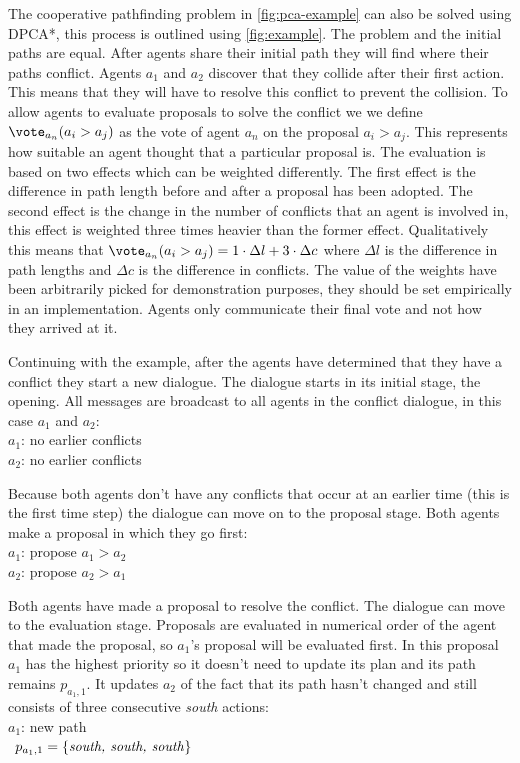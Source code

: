 The cooperative pathfinding problem in \autoref{fig:pca-example} can also be 
solved using DPCA*, this process is outlined using \autoref{fig:example}. The 
problem and the initial paths are equal. After agents share their initial path 
they will find where their paths conflict. Agents $a_1$ and $a_2$ discover that 
they collide after their first action. This means that they will have to 
resolve this conflict to prevent the collision. To allow agents to evaluate 
proposals to solve the conflict we we define $\vote_{a_n}(a_i > a_j)$ as 
the vote of agent $a_n$ on the proposal $a_i > a_j$. This represents how 
suitable an agent thought that a particular proposal is. The evaluation  is 
based on two effects which can be weighted
differently. The first effect is the difference in path length before and after
a proposal has been adopted. The second effect is the change in the number of
conflicts that an agent is involved in, this effect is weighted three times
heavier than the former effect. Qualitatively this means that $\vote_{a_n}(a_i
> a_j) = 1 \cdot \Delta l + 3 \cdot \Delta c$ where $\Delta l$ is the
difference in path lengths and $\Delta c$ is the difference in conflicts. The 
value of the weights have been arbitrarily picked for demonstration purposes, 
they should be set empirically in an implementation.
Agents only communicate their final vote and not how they arrived at it.

Continuing with the example, after the agents have determined that they have a
conflict they start a new dialogue. The dialogue starts in its initial stage,
the opening. All messages are broadcast to all agents in the conflict dialogue,
in this case $a_1$ and $a_2$:
\\ \-\qquad $a_1$: no earlier conflicts
\\ \-\qquad $a_2$: no earlier conflicts

Because both agents don't have any conflicts that occur at an earlier time
(this is the first time step) the dialogue can move on to the proposal stage.
Both agents make a proposal in which they go first:
\\ \-\qquad $a_1$: propose $a_1 > a_2$
\\ \-\qquad $a_2$: propose $a_2 > a_1$

Both agents have made a proposal to resolve the conflict. The dialogue can
move to the evaluation stage. Proposals are evaluated in numerical order of the 
agent that made the proposal, so $a_1$'s proposal will be evaluated first. In 
this proposal $a_1$ has the highest priority so it doesn't need to update its 
plan and its path remains $p_{a_1,1}$. It updates $a_2$ of the fact that its 
path hasn't changed and still consists of three consecutive \emph{south} 
actions:
\\ \-\qquad $a_1$: new path
\\ \-\qquad\quad\,\; $p_{a_1,1} = \{\text{\emph{south, south, south}}\}$

